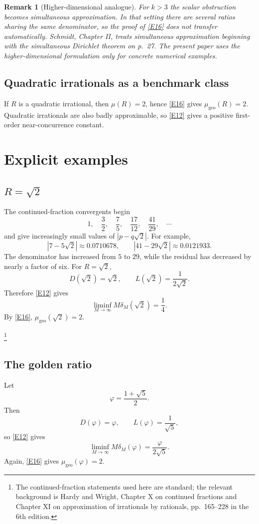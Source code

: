 \documentclass[12pt]{article}
\newtheorem{remark}[theorem]{Remark}
\begin{document}
\begin{remark}[Higher-dimensional analogue]
For $k>3$ the scalar obstruction becomes simultaneous approximation. In that setting there are several ratios sharing the same denominator, so the proof of \eqref{E16} does not transfer automatically. Schmidt, Chapter II, treats simultaneous approximation beginning with the simultaneous Dirichlet theorem on p.~27. The present paper uses the higher-dimensional formulation only for concrete numerical examples.
\end{remark}

\subsection{Quadratic irrationals as a benchmark class}
If $R$ is a quadratic irrational, then $\mu(R)=2$, hence \eqref{E16} gives $\mu_{\mathrm{geo}}(R)=2$. Quadratic irrationals are also badly approximable, so \eqref{E12} gives a positive first-order near-concurrence constant.

\section{Explicit examples}

\subsection{$R=\sqrt2$}
The continued-fraction convergents begin
\[
1,
\quad \frac32,
\quad \frac75,
\quad \frac{17}{12},
\quad \frac{41}{29},
\quad\cdots
\]
and give increasingly small values of $|p-q\sqrt2|$. For example,
\[
|7-5\sqrt2|\approx0.0710678,
\qquad
|41-29\sqrt2|\approx0.0121933.
\]
The denominator has increased from $5$ to $29$, while the residual has decreased by nearly a factor of six. For $R=\sqrt2$,
\[
D(\sqrt2)=\sqrt2,
\qquad
L(\sqrt2)=\frac1{2\sqrt2}.
\]
Therefore \eqref{E12} gives
\[
\liminf_{M\to\infty}M\delta_M(\sqrt2)=\frac14.
\]
By \eqref{E16}, $\mu_{\mathrm{geo}}(\sqrt2)=2$.

\footnote{The continued-fraction statements used here are standard; the relevant background is Hardy and Wright, Chapter X on continued fractions and Chapter XI on approximation of irrationals by rationals, pp.~165--228 in the 6th edition.}

\subsection{The golden ratio}
Let
\[
\varphi=\frac{1+\sqrt5}{2}.
\]
Then
\[
D(\varphi)=\varphi,
\qquad
L(\varphi)=\frac1{\sqrt5},
\]
so \eqref{E12} gives
\[
\liminf_{M\to\infty}M\delta_M(\varphi)=\frac{\varphi}{2\sqrt5}.
\]
Again, \eqref{E16} gives $\mu_{\mathrm{geo}}(\varphi)=2$.
\end{document}
